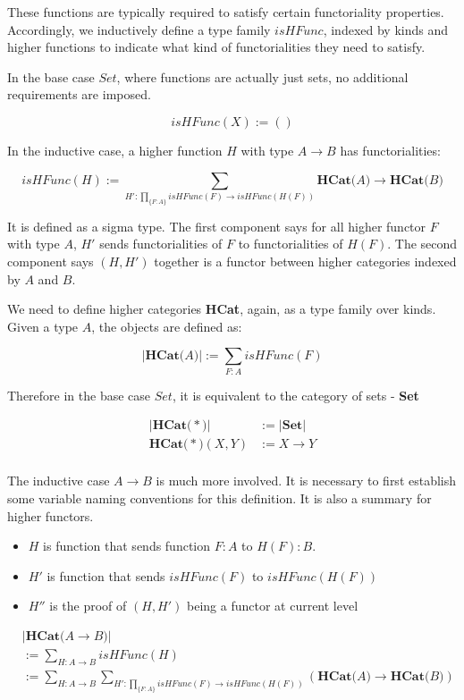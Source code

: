 These functions are typically required to satisfy certain functoriality properties. Accordingly, we inductively define a type family $isHFunc$, indexed by kinds and higher functions to indicate what kind of functorialities they need to satisfy.

In the base case $Set$, where functions are actually just sets, no additional requirements are imposed.

\[ isHFunc(X) := () \]

In the inductive case, a higher function $H$ with type $A \to B$ has functorialities:

\[ isHFunc(H) := \sum_{H' : \prod_{\{F : A\}} isHFunc(F) \to isHFunc(H(F))} \textbf{HCat(} A \textbf{)} \to \textbf{HCat(} B \textbf{)} \]

It is defined as a sigma type. The first component says for all higher functor $F$ with type $A$, $H'$ sends functorialities of $F$ to functorialities of $H(F)$. The second component says $(H , H')$ together is a functor between higher categories indexed by $A$ and $B$.

We need to define higher categories \textbf{HCat}, again, as a type family over kinds. Given a type $A$, the objects are defined as:

\[ \lvert\textbf{HCat(} A \textbf{)}\rvert := \sum_{F : A} isHFunc(F) \]

Therefore in the base case $Set$, it is equivalent to the category of sets - \textbf{Set}

\begin{align*}
\lvert\textbf{HCat(} * \textbf{)}\rvert &:= \lvert\textbf{Set}\rvert \\
\textbf{HCat(} * \textbf{)} (X , Y) &:= X \to Y \\
\end{align*}

The inductive case $A \to B$ is much more involved. It is necessary to first establish some variable naming conventions for this definition. It is also a summary for higher functors.

\begin{itemize}
  \item{$H$ is function that sends function $F : A$ to $H(F) : B$}.
  \item{$H'$ is function that sends $isHFunc(F)$ to $isHFunc(H(F))$}
  \item{$H''$ is the proof of $(H , H')$ being a functor at current level}
\end{itemize}

\begin{align*}
& \lvert\textbf{HCat(} A \to B \textbf{)}\rvert \\
&:= \sum_{H : A \to B} isHFunc(H) \\
&:= \sum_{H : A \to B} \sum_{H' : \prod_{\{F : A\}} isHFunc(F) \to isHFunc(H(F))} (\textbf{HCat(} A \textbf{)} \to \textbf{HCat(} B \textbf{)}) \\
\end{align*}

